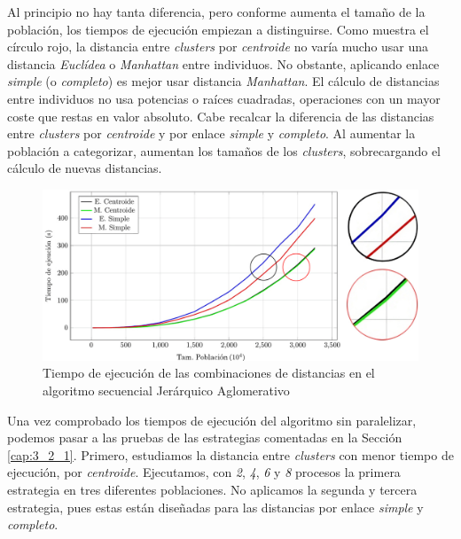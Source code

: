 Al principio no hay tanta diferencia, pero conforme aumenta el tamaño de la población, los tiempos de ejecución empiezan a distinguirse. Como muestra el círculo rojo, la distancia entre \textit{clusters} por \textit{centroide} no varía mucho usar una distancia \textit{Euclídea} o \textit{Manhattan} entre individuos. No obstante, aplicando enlace \textit{simple} (o \textit{completo}) es mejor usar distancia \textit{Manhattan}. El cálculo de distancias entre individuos no usa potencias o raíces cuadradas, operaciones con un mayor coste que restas en valor absoluto. Cabe recalcar la diferencia de las distancias entre \textit{clusters} por \textit{centroide} y por enlace \textit{simple} y \textit{completo}. Al aumentar la población a categorizar, aumentan los tamaños de los \textit{clusters}, sobrecargando el cálculo de nuevas distancias.


\begin{figure}[!h]
	\centering
	\includegraphics[width=\textwidth]{images/chapter_4/jerarquico}
	\caption{Tiempo de ejecución de las combinaciones de distancias en el algoritmo secuencial Jerárquico Aglomerativo}
	\label{fig:prueba_jerarquicosec}
\end{figure}





Una vez comprobado los tiempos de ejecución del algoritmo sin paralelizar, podemos pasar a las pruebas de las estrategias comentadas en la Sección \ref{cap:3_2_1}. Primero, estudiamos la distancia entre \textit{clusters} con menor tiempo de ejecución, por \textit{centroide}. Ejecutamos, con \textit{2}, \textit{4}, \textit{6} y \textit{8} procesos la primera estrategia en tres diferentes poblaciones. No aplicamos la segunda y tercera estrategia, pues estas están diseñadas para las distancias por enlace \textit{simple} y \textit{completo}.


